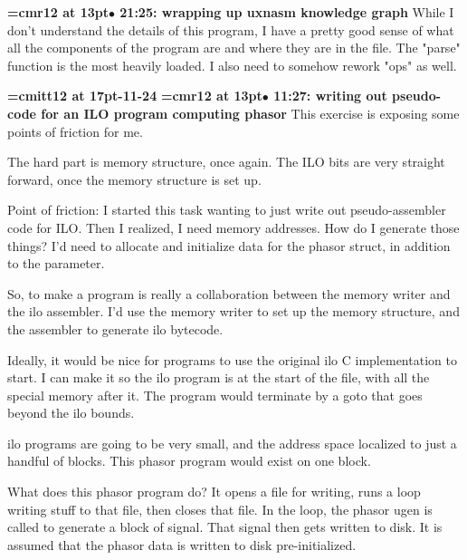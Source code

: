 {\smallskip\noindent\bf\font\titlefont=cmr12 at 13pt\titlefont $\bullet$ 21:25: wrapping up uxnasm knowledge graph}\smallskip
While I don't understand the details of this program, I have a pretty good sense of what all the components of the program are and where they are in the file. The "parse" function is the most heavily loaded. I also need to somehow rework "ops" as well.
\par

{\medskip\noindent\bf\font\titlefont=cmitt12 at 17pt-11-24}\medskip
{\smallskip\noindent\bf\font\titlefont=cmr12 at 13pt\titlefont $\bullet$ 11:27: writing out pseudo-code for an ILO program computing phasor}\smallskip
This exercise is exposing some points of friction for me.
\par

The hard part is memory structure, once again. The ILO bits are very straight forward, once the memory structure is set up.
\par

Point of friction: I started this task wanting to just write out pseudo-assembler code for ILO. Then I realized, I need memory addresses. How do I generate those things? I'd need to allocate and initialize data for the phasor struct, in addition to the parameter.
\par

So, to make a program is really a collaboration between the memory writer and the ilo assembler. I'd use the memory writer to set up the memory structure, and the assembler to generate ilo bytecode.
\par

Ideally, it would be nice for programs to use the original ilo C implementation to start. I can make it so the ilo program is at the start of the file, with all the special memory after it. The program would terminate by a goto that goes beyond the ilo bounds.
\par

ilo programs are going to be very small, and the address space localized to just a handful of blocks. This phasor program would exist on one block.
\par

What does this phasor program do? It opens a file for writing, runs a loop writing stuff to that file, then closes that file. In the loop, the phasor ugen is called to generate a block of signal. That signal then gets written to disk. It is assumed that the phasor data is written to disk pre-initialized.
\par

